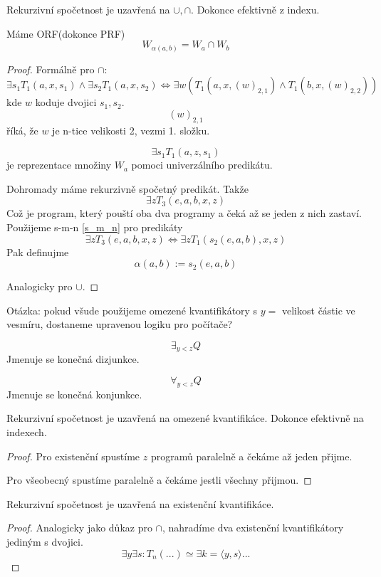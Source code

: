 \begin{theorem}[Uzavřenost RS]
	Rekurzivní spočetnost je uzavřená na $\cup, \cap$.
	Dokonce efektivně z indexu.

	Máme ORF(dokonce PRF)
	\[ W_{\alpha(a, b)} = W_a \cap W_b \]
\end{theorem}
\begin{proof}
	Formálně pro $\cap$:
	\[ \exists s_1 T_1(a, x, s_1) \land \exists s_2 T_1(a, x, s_2) \iff \exists w(T_1(a, x, (w)_{2,1}) \land T_1(b, x, (w)_{2,2})) \]
	kde $w$ koduje dvojici $s_1, s_2$.
	\[ (w)_{2,1} \]
	říká, že $w$ je n-tice velikosti 2, vezmi 1. složku.

	\[ \exists s_1 T_1(a, z, s_1) \]
	je reprezentace množiny $W_a$ pomoci univerzálního predikátu.

	Dohromady máme rekurzivně spočetný predikát. Takže
	\[ \exists z T_3(e, a, b, x, z) \]
	Což je program, který pouští oba dva programy a čeká až se jeden z nich zastaví.
	Použijeme s-m-n \cref{s_m_n} pro predikáty
	\[ \exists z T_3(e, a, b, x, z) \iff \exists z T_1(s_2(e, a, b), x , z) \]
	Pak definujme
	\[ \alpha(a, b) := s_2(e, a, b) \]

	Analogicky pro $\cup$.
\end{proof}

Otázka: pokud všude použijeme omezené kvantifikátory s $y =$ velikost částic ve vesmíru, dostaneme upravenou logiku pro počítače?

\begin{definition}
	\[ \exists_{y < z} Q \]
	Jmenuje se konečná dizjunkce.
\end{definition}

\begin{definition}
	\[ \forall_{y < z} Q \]
	Jmenuje se konečná konjunkce.
\end{definition}

\begin{theorem}\label{omez_kvant}
	Rekurzivní spočetnost je uzavřená na omezené kvantifikáce.
	Dokonce efektivně na indexech.
\end{theorem}
\begin{proof}
	Pro existenční spustíme $z$ programů paralelně a čekáme až jeden přijme.

	Pro všeobecný spustíme paralelně a čekáme jestli všechny přijmou.
\end{proof}

\begin{theorem}\label{neomez_kvant}
	Rekurzivní spočetnost je uzavřená na existenční kvantifikáce.
\end{theorem}
\begin{proof}
	Analogicky jako důkaz pro $\cap$, nahradíme dva existenční kvantifikátory jediným s dvojici.
	\[ \exists y \exists s: T_n(...) \simeq \exists k = \langle y, s \rangle ... \]
\end{proof}

